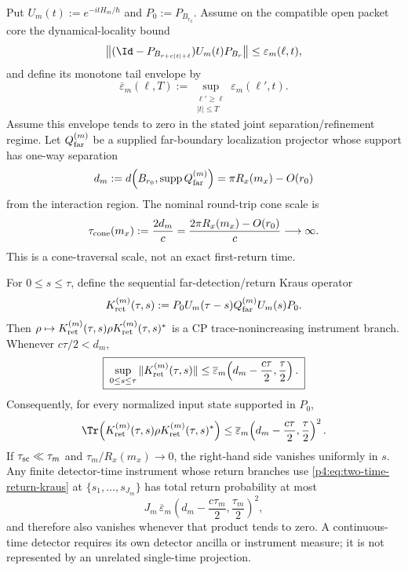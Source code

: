 \documentclass[12pt,a4paper]{article}
\begin{document}
\begin{lemma}
\label{p4:lem:derived-scattering-plateau}
Put \(U_m(t):=e^{-itH_m/\hbar}\) and
\(P_0:=P_{B_{r_0}}\).  Assume on the compatible open packet core the
dynamical-locality bound
\begin{equation}
\label{p4:eq:scattering-quasilocal-propagation}
\left\|
(\Id-P_{B_{r+c|t|+\ell}})U_m(t)P_{B_r}
\right\|
\le \varepsilon_m(\ell,t),
\end{equation}
and define its monotone tail envelope by
\[
\overline\varepsilon_m(\ell,T)
:=
\sup_{\substack{\ell'\ge\ell\\ |t|\le T}}
\varepsilon_m(\ell',t).
\]
Assume this envelope tends to zero in the stated joint
separation/refinement regime.  Let \(Q_{\rm far}^{(m)}\) be a supplied
far-boundary localization projector whose support has one-way separation
\[
d_m
:=
d\!\left(B_{r_0},\operatorname{supp}Q_{\rm far}^{(m)}\right)
=\pi R_x(m_x)-O(r_0)
\]
from the interaction region.  The nominal round-trip cone scale is
\[
\tau_{\rm cone}(m_x):=\frac{2d_m}{c}
=\frac{2\pi R_x(m_x)-O(r_0)}{c}
\longrightarrow\infty.
\]
This is a cone-traversal scale, not an exact first-return time.

For \(0\le s\le\tau\), define the sequential far-detection/return Kraus
operator
\begin{equation}
\label{p4:eq:two-time-return-kraus}
K_{\rm ret}^{(m)}(\tau,s)
:=
P_0U_m(\tau-s)Q_{\rm far}^{(m)}U_m(s)P_0 .
\end{equation}
Then \(\rho\mapsto K_{\rm ret}^{(m)}(\tau,s)\rho
K_{\rm ret}^{(m)}(\tau,s)^*\) is a CP trace-nonincreasing instrument branch.
Whenever \(c\tau/2<d_m\),
\begin{equation}
\label{p4:eq:two-time-return-bound}
\boxed{\;
\sup_{0\le s\le\tau}
\|K_{\rm ret}^{(m)}(\tau,s)\|
\le
\overline\varepsilon_m\!\left(d_m-\frac{c\tau}{2},
\frac{\tau}{2}\right).
\;}
\end{equation}
Consequently, for every normalized input state supported in \(P_0\),
\[
\Tr\!\left(
K_{\rm ret}^{(m)}(\tau,s)\rho
K_{\rm ret}^{(m)}(\tau,s)^*
\right)
\le
\overline\varepsilon_m\!\left(d_m-\frac{c\tau}{2},
\frac{\tau}{2}\right)^2.
\]
If \(\tau_{\rm sc}\ll\tau_m\) and
\(\tau_m/R_x(m_x)\to0\), the right-hand side vanishes uniformly in
\(s\).  Any finite detector-time instrument whose return branches use
\eqref{p4:eq:two-time-return-kraus} at
\(\{s_1,\ldots,s_{J_m}\}\) has total return probability at most
\[
J_m\,
\overline\varepsilon_m\!\left(d_m-\frac{c\tau_m}{2},
\frac{\tau_m}{2}\right)^2,
\]
and therefore also vanishes whenever that product tends to zero.  A
continuous-time detector requires its own detector ancilla or instrument
measure; it is not represented by an unrelated single-time projection.
\end{lemma}
\end{document}
